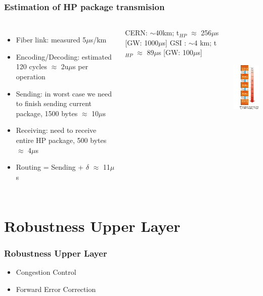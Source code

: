 \documentclass[]{beamer}
\begin{document}
\begin{frame}
  \frametitle{Estimation of HP package transmision}   %
  \begin{columns}[c]
  \column{3in}  %
  \begin{itemize}
  \item Fiber link: measured 5$\mu$s/km
  \item Encoding/Decoding: estimated 120 cycles $\approx$ 2u$\mu$s per operation
  \item Sending: in worst case we need to finish sending current package, 1500 bytes $\approx$ 10$\mu$s
  \item Receiving: need to receive entire HP package, 500 bytes $\approx$ 4$\mu$s
  \item Routing = Sending + $\delta$ $\approx$ 11$\mu$s
  \end{itemize}

CERN: $\sim$40km; t$_{HP}$ $\approx$ 256$\mu$s [GW: 1000$\mu$s]
GSI : $\sim$4 km; t$_{HP}$ $\approx$  89$\mu$s [GW:  100$\mu$s]

  \column{3in}

  \includegraphics[height=6.2cm,keepaspectratio]{../../figures/robustness/granuality_window}

  \end{columns}
\end{frame}

\section{Robustness Upper Layer}

\begin{frame}
  \frametitle{Robustness Upper Layer}   %

  \begin{itemize}
  \item Congestion Control
  \item Forward Error Correction
  \end{itemize}
\end{frame}
\end{document}
